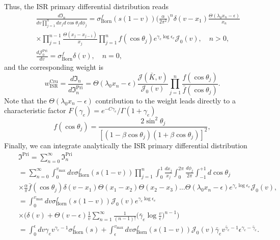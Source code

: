 Thus, the ISR primary differential distribution reads
\begin{eqnarray}
&&\frac{d\mathfrak{I}_n}{dv\prod_{j=1}^{n}dx_jd\cos\theta_jd\phi_j}=\sigma^f_\text{Born}(s(1-v))\biggl(\frac{\alpha}{2\pi^2}\biggr)^n\delta(v-x_1)\frac{\Theta(\lambda_0x_n-\epsilon)}{x_n}\nonumber\\
&&\times\prod_{j=1}^{n-1}\frac{\Theta(x_j-x_{j-1})}{x_j}\prod_{j=1}^{n}f(\cos\theta_j)e^{\gamma_e\log\epsilon_e}\mathcal{J}_0(v),\quad n>0,\nonumber\\
&&\frac{d\mathcal{J}^\text{Pri}_0}{dv}=\sigma^f_\text{Born}\delta(v),\quad n=0,
\end{eqnarray}
and the corresponding weight is
\begin{equation}
w^\text{Cru}_\text{ISR}=\frac{d\mathfrak{I}_n}{d\mathfrak{I}^\text{Pri}_n}=\Theta(\lambda_0 x_n-\epsilon)\frac{\mathcal{J}(\bar{K},v)}{\mathcal{J}_0(v)}\prod_{j=1}^{n}\frac{f(\cos\theta_j)}{\bar{f}(\cos\theta_j)}.
\end{equation}
Note that the $\Theta(\lambda_0x_n-\epsilon)$ contribution to the weight leads directly to a characteristic factor $F(\gamma_e)=e^{-C\gamma_e}/\Gamma(1+\gamma_e)$ \cite{YFS2,MPI}
\begin{equation}
f(\cos\theta_j)=\frac{2\sin^2\theta_j}{[(1-\beta\cos\theta_j)(1+\beta\cos\theta_j)]^2},
\end{equation}
Finally, we can integrate analytically the ISR primary differential distribution
\begin{eqnarray}
&&\mathfrak{I}^\text{Pri}=\sum_{n=0}^{\infty}\mathfrak{I}^\text{Pri}_n\nonumber\\
&&=\sum_{n=0}^{\infty}\int_{0}^{v_\text{max}}dv\sigma^f_\text{Born}(s(1-v))\prod_{j=1}^{n}\int_{0}^{1}\frac{dx_j}{x_j}\int_{0}^{2\pi}\frac{d\phi_j}{2\pi}\int_{-1}^{+1}d\cos\theta_j\nonumber\\
&&\times\frac{\alpha}{\pi}\bar{f}(\cos\theta_j)\delta(v-x_1)\Theta(x_1-x_2)\Theta(x_2-x_3)\ldots\Theta(\lambda_0x_n-\epsilon)e^{\gamma_e\log\epsilon_e}\mathcal{J}_0(v),\nonumber\\
&&=\int_{0}^{v_\text{max}}dv\sigma^f_\text{Born}(s(1-v))\mathcal{J}_0(v)e^{\gamma_e\log\epsilon_e}\nonumber\\
&&\times\biggl(\delta(v)+\Theta(v-\epsilon)\frac{1}{v}\sum_{n=1}^{\infty}\frac{1}{(n-1)!}\biggl(\bar{\gamma}_e\log\frac{v}{\epsilon}\biggr)^{n-1}\biggr)\nonumber\\
&&=\int_{0}^{\epsilon}dv\gamma_e v^{\gamma_e-1}\sigma^f_\text{Born}(s)+\int_{\epsilon}^{v_\text{max}}dv\sigma^f_\text{Born}(s(1-v))\mathcal{J}_0(v)\bar{\gamma}_e
v^{\bar{\gamma}_e-1}\epsilon^{\gamma_e-\bar{\gamma}_e}.\nonumber\\
\end{eqnarray}

